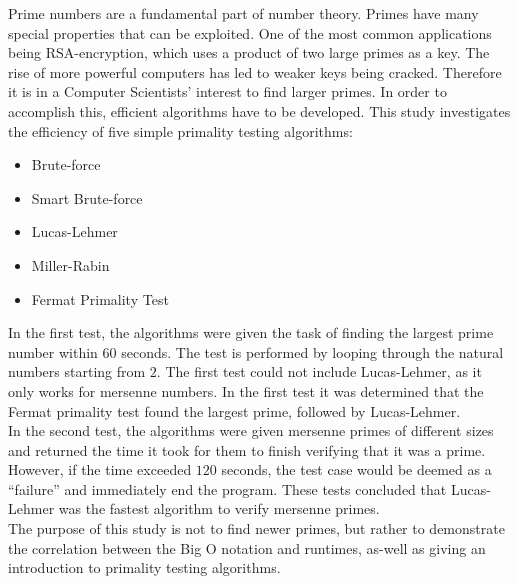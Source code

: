 \documentclass[main.tex]{subfiles}
\begin{document}
Prime numbers are a fundamental part of number theory. Primes have many special
properties that can be exploited. One of the most common applications being
RSA-encryption, which uses a product of two large primes as a key. The rise of
more powerful computers has led to weaker keys being cracked. Therefore it is in
a Computer Scientists' interest to find larger primes. In order to accomplish
this, efficient algorithms have to be developed. This study investigates the efficiency of five simple primality testing
algorithms:
\begin{multicols}{3}
  \begin{itemize}
  \item Brute-force
  \item Smart Brute-force
  \item Lucas-Lehmer
  \item Miller-Rabin
  \item Fermat Primality Test
  \end{itemize}
\end{multicols}

In the first test, the algorithms were given the task of finding the largest
prime number within $60$ seconds. The test is performed by looping through the
natural numbers starting from $2$. The first test could not include
Lucas-Lehmer, as it only works for mersenne numbers. In the first test it was
determined that the Fermat primality test found the largest prime, followed by Lucas-Lehmer. \\

In the second test, the algorithms were given mersenne primes of different sizes
and returned the time it took for them to finish verifying that it was a prime.
However, if the time exceeded $120$ seconds, the test case would be deemed as a
``failure'' and immediately end the program. These tests concluded that
Lucas-Lehmer was the fastest algorithm to verify mersenne primes. \\

The purpose of this study is not to find newer primes, but rather to demonstrate
the correlation between the Big O notation and runtimes, as-well as giving an
introduction to primality testing algorithms. \\
\end{document}
